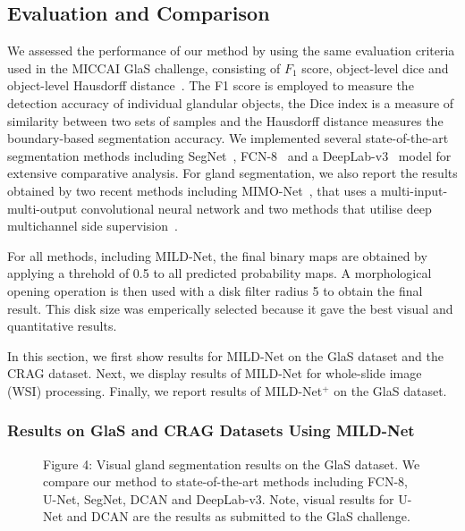 \documentclass[3p]{elsarticle}
\begin{document}
\subsection{Evaluation and Comparison}
We assessed the performance of our method by using the same evaluation criteria used in the MICCAI GlaS challenge, consisting of $F_1$ score, object-level dice and object-level Hausdorff distance~\citep{sirinukunwattana2017gland}. The F1 score is employed to measure the detection accuracy of individual glandular objects, the Dice index is a measure of similarity between two sets of samples and the Hausdorff distance measures the boundary-based segmentation accuracy. We implemented several state-of-the-art segmentation methods including SegNet~\citep{badrinarayanan2015segnet}, FCN-8~\citep{long2015fully} and a DeepLab-v3~\citep{chen2018deeplab} model for extensive comparative analysis. For gland segmentation, we also report the results obtained by two recent methods including MIMO-Net~\citep{raza2017mimonet}, that uses a multi-input-multi-output convolutional neural network and two methods that utilise deep multichannel side supervision~\citep{xu2016gland,xu2017gland}.

For all methods, including MILD-Net, the final binary maps are obtained by applying a threhold of 0.5 to all predicted probability maps. A morphological opening operation is then used with a disk filter radius 5 to obtain the final result. This disk size was emperically selected because it gave the best visual and quantitative results. 

In this section, we first show results for MILD-Net on the GlaS dataset and the CRAG dataset. Next, we display results of MILD-Net for whole-slide image (WSI) processing. Finally, we report results of MILD-Net$^+$ on the GlaS dataset. 

\subsubsection{Results on GlaS and CRAG Datasets Using MILD-Net}
\begin{figure}[!t]
\centering
\captionsetup[subfigure]{labelformat=empty}
\caption*{Figure 4: Visual gland segmentation results on the GlaS dataset. We compare our method to state-of-the-art methods including FCN-8, U-Net, SegNet, DCAN and DeepLab-v3. Note, visual results for U-Net and DCAN are the results as submitted to the GlaS challenge.}
\end{figure}
\end{document}
